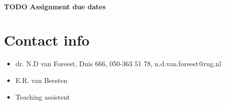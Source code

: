 \documentclass[a4paper]{article}
\theoremstyle{definition}
\newcommand{\1}[1]{\,I_{#1}} %
\begin{document}
\paragraph{{\bfseries\sffamily TODO} Assignment due dates}
\label{sec:org95c1ae9}







\section{Contact info}
\label{sec:orgf4ef0b9}

\begin{itemize}
\item dr. N.D van Foreest, Duis 666, 050-363 51 78, n.d.van.foreest@rug.nl
\item E.R. van Beesten
\item Teaching assistent
\end{itemize}
\end{document}
